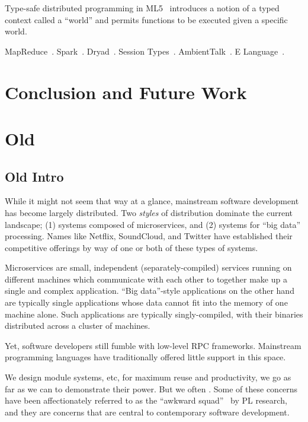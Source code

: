 \documentclass[preprint]{sigplanconf}
\theoremstyle{definition}
\theoremstyle{definition}
\begin{document}
Type-safe distributed programming in ML5~\cite{Tom7} introduces a notion of a
typed context called a ``world'' and permits functions to be executed given a
specific world.

MapReduce~\cite{MapReduce}. Spark~\cite{Spark}. Dryad~\cite{Dryad}. Session
Types~\cite{SessionTypes}. AmbientTalk~\cite{AmbientTalk}. E
Language~\cite{ELang}.



\section{Conclusion and Future Work}
\label{sec:conclusion-future-work}

\section{Old}

\subsection{Old Intro}


While it might not seem that way at a glance, mainstream software development
has become largely distributed. Two {\em styles} of distribution
dominate the current landscape; (1) systems composed of microservices,
and (2) systems for ``big data'' processing. Names like Netflix, SoundCloud,
and Twitter have established their competitive offerings by way of one or
both of these types of systems.

Microservices are small, independent (separately-compiled) services running on
different machines which communicate with each other to together make up a
single and complex application. ``Big data''-style applications on the other
hand are typically single applications whose data cannot fit into the memory
of one machine alone. Such applications are typically singly-compiled, with
their binaries distributed across a cluster of machines.

Yet, software developers still fumble with low-level RPC frameworks.
Mainstream programming languages have traditionally offered little support in
this space.

We design module systems, etc, for maximum reuse and productivity, we go as
far as we can to demonstrate their power. But we often . Some of these
concerns have been affectionately referred to as the ``awkward
squad''~\cite{AwkwardSquad} by PL research, and they are concerns that are central to
contemporary software development.
\end{document}
